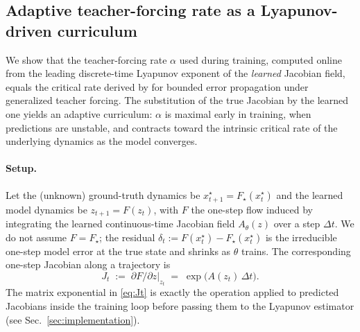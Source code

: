 %
%

\subsection{Adaptive teacher-forcing rate as a Lyapunov-driven curriculum}
\label{sec:tf-lyap}

We show that the teacher-forcing rate $\alpha$ used during training,
computed online from the leading discrete-time Lyapunov exponent of the
\emph{learned} Jacobian field, equals the critical rate derived by
\citet{HessEtAl2023} for bounded error propagation under generalized
teacher forcing. The substitution of the true Jacobian by the learned
one yields an adaptive curriculum: $\alpha$ is maximal early in
training, when predictions are unstable, and contracts toward the
intrinsic critical rate of the underlying dynamics as the model
converges.

\paragraph{Setup.}
Let the (unknown) ground-truth dynamics be $x_{t+1}^\star = F_\star(x_t^\star)$
and the learned model dynamics be $z_{t+1} = F(z_t)$, with $F$ the
one-step flow induced by integrating the learned continuous-time
Jacobian field $A_\theta(z)$ over a step $\Delta t$. We do not assume
$F = F_\star$; the residual $\delta_t := F(x_t^\star) - F_\star(x_t^\star)$
is the irreducible one-step model error at the true state and shrinks
as $\theta$ trains.
The corresponding one-step Jacobian along a trajectory is
%
\begin{equation}
  J_t \;:=\; \left.\partial F/\partial z\right|_{z_t}
  \;=\; \exp\!\bigl(A(z_t)\,\Delta t\bigr).
  \label{eq:Jt}
\end{equation}
%
The matrix exponential in \eqref{eq:Jt} is exactly the operation
applied to predicted Jacobians inside the training loop before passing
them to the Lyapunov estimator (see Sec.~\ref{sec:implementation}).

